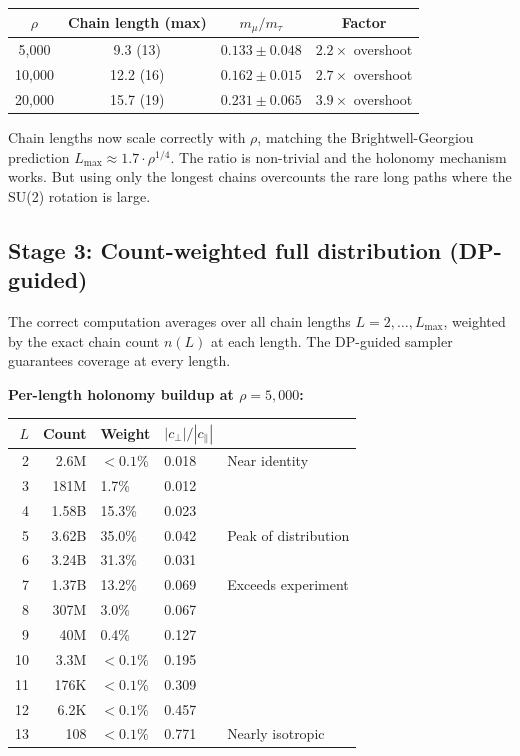 \documentclass[11pt,letterpaper]{article}
\begin{document}
\begin{center}
\begin{tabular}{@{}cccc@{}}
\toprule
$\rho$ & Chain length (max) & $m_\mu/m_\tau$ & Factor \\
\midrule
5{,}000 & 9.3 (13) & $0.133 \pm 0.048$ & $2.2\times$ overshoot \\
10{,}000 & 12.2 (16) & $0.162 \pm 0.015$ & $2.7\times$ overshoot \\
20{,}000 & 15.7 (19) & $0.231 \pm 0.065$ & $3.9\times$ overshoot \\
\bottomrule
\end{tabular}
\end{center}

\noindent Chain lengths now scale correctly with $\rho$, matching the
Brightwell-Georgiou prediction $L_{\max} \approx 1.7 \cdot \rho^{1/4}$.
The ratio is non-trivial and the holonomy mechanism works. But using
only the longest chains overcounts the rare long paths where the SU(2)
rotation is large.

\subsection{Stage 3: Count-weighted full distribution (DP-guided)}

The correct computation averages over all chain lengths $L = 2, \ldots,
L_{\max}$, weighted by the exact chain count $n(L)$ at each length.
The DP-guided sampler guarantees coverage at every length.

\medskip
\noindent\textbf{Per-length holonomy buildup at $\rho = 5{,}000$:}

\begin{center}
\begin{tabular}{@{}rrlll@{}}
\toprule
$L$ & Count & Weight & $|c_\perp|/|c_\parallel|$ & \\
\midrule
2 & 2.6M & $< 0.1\%$ & 0.018 & Near identity \\
3 & 181M & 1.7\% & 0.012 & \\
4 & 1.58B & 15.3\% & 0.023 & \\
5 & 3.62B & 35.0\% & 0.042 & Peak of distribution \\
6 & 3.24B & 31.3\% & 0.031 & \\
7 & 1.37B & 13.2\% & 0.069 & Exceeds experiment \\
8 & 307M & 3.0\% & 0.067 & \\
9 & 40M & 0.4\% & 0.127 & \\
10 & 3.3M & $< 0.1\%$ & 0.195 & \\
11 & 176K & $< 0.1\%$ & 0.309 & \\
12 & 6.2K & $< 0.1\%$ & 0.457 & \\
13 & 108 & $< 0.1\%$ & 0.771 & Nearly isotropic \\
\bottomrule
\end{tabular}
\end{center}
\end{document}
